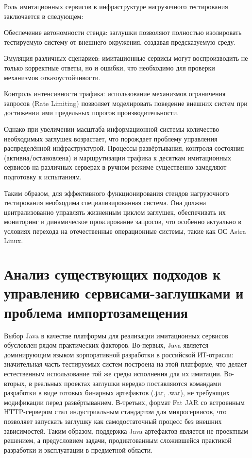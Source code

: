 Роль имитационных сервисов в инфраструктуре нагрузочного тестирования заключается в следующем:

\begin{compactlist}
\item Обеспечение автономности стенда: заглушки позволяют полностью изолировать тестируемую систему от внешнего окружения, создавая предсказуемую среду.
\item Эмуляция различных сценариев: имитационные сервисы могут воспроизводить не только корректные ответы, но и ошибки, что необходимо для проверки механизмов отказоустойчивости.
\item Контроль интенсивности трафика: использование механизмов ограничения запросов (Rate Limiting) позволяет моделировать поведение внешних систем при достижении ими предельных порогов производительности.
\end{compactlist}

Однако при увеличении масштаба информационной системы количество необходимых заглушек возрастает, что порождает проблему управления распределённой инфраструктурой. Процессы развёртывания, контроля состояния (активна/остановлена) и маршрутизации трафика к десяткам имитационных сервисов на различных серверах в ручном режиме существенно замедляют подготовку к испытаниям.

Таким образом, для эффективного функционирования стендов нагрузочного тестирования необходима специализированная система. Она должна централизованно управлять жизненным циклом заглушек, обеспечивать их мониторинг и динамическое проксирование запросов, что особенно актуально в условиях перехода на отечественные операционные системы, такие как ОС Astra Linux.

\section{Анализ существующих подходов к управлению сервисами-заглушками и проблема импортозамещения}

Выбор Java в качестве платформы для реализации имитационных сервисов обусловлен рядом практических факторов. Во-первых, Java является доминирующим языком корпоративной разработки в российской ИТ-отрасли: значительная часть тестируемых систем построена на этой платформе, что делает естественным использование той же среды исполнения для их имитации. Во-вторых, в реальных проектах заглушки нередко поставляются командами разработки в виде готовых бинарных артефактов (.jar, .war), не требующих модификации перед развёртыванием. В-третьих, формат Fat JAR со встроенным HTTP-сервером стал индустриальным стандартом для микросервисов, что позволяет запускать заглушку как самодостаточный процесс без внешних зависимостей. Таким образом, поддержка Java-артефактов является не проектным решением, а предусловием задачи, продиктованным сложившейся практикой разработки и эксплуатации в предметной области.

